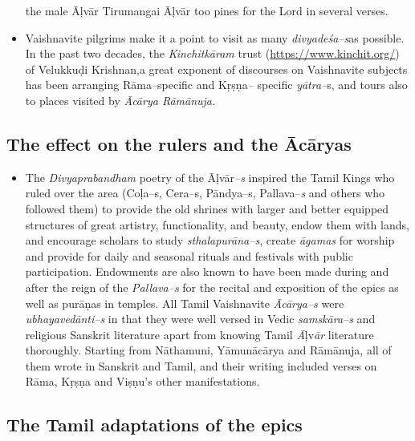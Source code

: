 \begin{itemize}
the male Āļvār Tirumangai Āļvār too pines for the Lord in several verses.

 \item Vaishnavite pilgrims make it a point to visit as many \textit{divyadeśa–s}\break as possible. In the past two decades, the \textit{Kinchitkāram} trust (\url{https://www.kinchit.org/}) of Velukkuḍi Krishnan,a great exponent of discourses on Vaishnavite subjects has been arranging Rāma\textit{–}specific and Kṛṣṇa\textit{–} specific \textit{yātra–}s, and tours also to places visited by \textit{Ācārya Rāmānuja.}

\end{itemize}


\subsection*{The effect on the rulers and the Ācāryas}

\begin{itemize}
\item The \textit{Divyaprabandham} poetry of the Āļvār\textit{–s} inspired the Tamil Kings who ruled over the area (Coļa–s, Cera–s, Pāndya–s, Pallava–\textit{s} and others who followed them) to provide the old shrines with larger and better equipped structures of great artistry, functionality, and beauty, endow them with lands, and encourage scholars to study \textit{sthalapurāna–s}, create \textit{āgamas} for worship and provide for daily and seasonal rituals and festivals with public participation. Endowments are also known to have been made during and after the reign of the \textit{Pallava–s} for the recital and exposition of the epics as well as purāņas in temples. All Tamil Vaishnavite \textit{Ācārya–s} were \textit{ubhayavedānti–s} in that they were well versed in Vedic \textit{samskāra–s} and religious Sanskrit literature apart from knowing Tamil \textit{Ā}ļv\textit{ār} literature thoroughly. Starting from Nāthamuni, Yāmunācārya and Rāmānuja, all of them wrote in Sanskrit and Tamil, and their writing included verses on Rāma, Kṛṣṇa and Viṣṇu’s other manifestations.

\end{itemize}


\subsection*{The Tamil adaptations of the epics}

